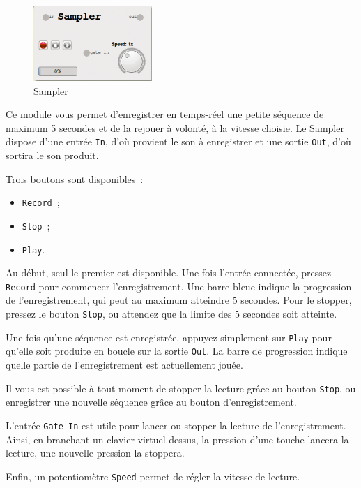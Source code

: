 \documentclass[a4paper,oneside,frenchb,10pt]{article}
\begin{document}
\begin{multicols}{2}
\begin{figure}[H]
\centering
\includegraphics[width=4.5cm]{../img/png/sampler.png}
\caption{Sampler}
\end{figure}

Ce module vous permet d'enregistrer en temps-réel une petite séquence de
maximum 5 secondes et de la rejouer à volonté, à la vitesse choisie. Le
Sampler dispose d'une entrée \verb!In!, d'où provient le son à
enregistrer et une sortie \verb!Out!, d'où sortira le son produit.

Trois boutons sont disponibles~:

\begin{itemize}
\item
  \verb!Record!~;
\item
  \verb!Stop!~;
\item
  \verb!Play!.
\end{itemize}
\end{multicols}

Au début, seul le premier est disponible. Une fois l'entrée connectée,
pressez \verb!Record! pour commencer l'enregistrement. Une barre bleue
indique la progression de l'enregistrement, qui peut au maximum
atteindre 5 secondes. Pour le stopper, pressez le bouton \verb!Stop!, ou
attendez que la limite des 5 secondes soit atteinte.

Une fois qu'une séquence est enregistrée, appuyez simplement sur
\verb!Play! pour qu'elle soit produite en boucle sur la sortie
\verb!Out!. La barre de progression indique quelle partie de
l'enregistrement est actuellement jouée.

Il vous est possible à tout moment de stopper la lecture grâce au bouton
\verb!Stop!, ou enregistrer une nouvelle séquence grâce au bouton
d'enregistrement.

L'entrée \verb!Gate In! est utile pour lancer ou stopper la lecture de
l'enregistrement. Ainsi, en branchant un clavier virtuel dessus, la
pression d'une touche lancera la lecture, une nouvelle pression la
stoppera.

Enfin, un potentiomètre \verb!Speed! permet de régler la vitesse de
lecture.
\end{document}
